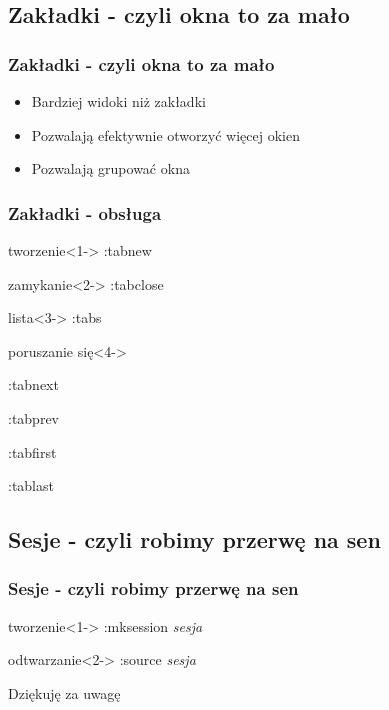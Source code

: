 \documentclass[10pt]{beamer}
\begin{document}
\subsection{Zakładki - czyli okna to za mało}
\begin{frame}
	\frametitle{Zakładki - czyli okna to za mało}
	\begin{itemize}[<+->]
	\item Bardziej widoki niż zakładki
	\item Pozwalają efektywnie otworzyć więcej okien
	\item Pozwalają grupować okna
	\end{itemize}
\end{frame}
\begin{frame}
	\frametitle{Zakładki - obsługa}
	\begin{block}{tworzenie}<1->
		:tabnew
	\end{block}
	\begin{block}{zamykanie}<2->
		:tabclose
	\end{block}
	\begin{block}{lista}<3->
	:tabs
	\end{block}
	\begin{block}{poruszanie się}<4->
		\begin{itemize}
			{ \item :tabnext }
			{ \item :tabprev }
			{ \item :tabfirst }
			{ \item :tablast }
		\end{itemize}
	\end{block}
\end{frame}
\subsection{Sesje - czyli robimy przerwę na sen}
\begin{frame}
	\frametitle{Sesje - czyli robimy przerwę na sen}
	\begin{block}{tworzenie}<1->
	:mksession \textit{sesja}
	\end{block}
	\begin{block}{odtwarzanie}<2->
	:source \textit{sesja}
	\end{block}
\end{frame}
\begin{frame}
	Dziękuję za uwagę
\end{frame}
\end{document}
